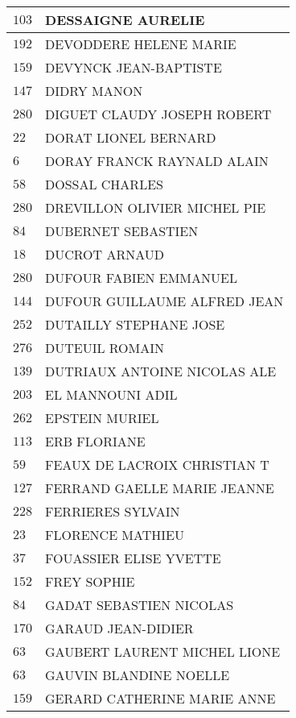 \begin{xltabular}{\linewidth}{|l|X|}
    $103$ & DESSAIGNE AURELIE \\
    \hline
    $192$ & DEVODDERE HELENE MARIE \\
    \hline
    $159$ & DEVYNCK JEAN-BAPTISTE \\
    \hline
    $147$ & DIDRY MANON \\
    \hline
    $280$ & DIGUET CLAUDY JOSEPH ROBERT \\
    \hline
    $22$ & DORAT LIONEL BERNARD \\
    \hline
    $6$ & DORAY FRANCK RAYNALD ALAIN \\
    \hline
    $58$ & DOSSAL CHARLES \\
    \hline
    $280$ & DREVILLON OLIVIER MICHEL PIE \\
    \hline
    $84$ & DUBERNET SEBASTIEN \\
    \hline
    $18$ & DUCROT ARNAUD \\
    \hline
    $280$ & DUFOUR FABIEN EMMANUEL \\
    \hline
    $144$ & DUFOUR GUILLAUME ALFRED JEAN \\
    \hline
    $252$ & DUTAILLY STEPHANE JOSE \\
    \hline
    $276$ & DUTEUIL ROMAIN \\
    \hline
    $139$ & DUTRIAUX ANTOINE NICOLAS ALE \\
    \hline
    $203$ & EL MANNOUNI ADIL \\
    \hline
    $262$ & EPSTEIN MURIEL \\
    \hline
    $113$ & ERB FLORIANE \\
    \hline
    $59$ & FEAUX DE LACROIX CHRISTIAN T \\
    \hline
    $127$ & FERRAND GAELLE MARIE JEANNE \\
    \hline
    $228$ & FERRIERES SYLVAIN \\
    \hline
    $23$ & FLORENCE MATHIEU \\
    \hline
    $37$ & FOUASSIER ELISE YVETTE \\
    \hline
    $152$ & FREY SOPHIE \\
    \hline
    $84$ & GADAT SEBASTIEN NICOLAS \\
    \hline
    $170$ & GARAUD JEAN-DIDIER \\
    \hline
    $63$ & GAUBERT LAURENT MICHEL LIONE \\
    \hline
    $63$ & GAUVIN BLANDINE NOELLE \\
    \hline
    $159$ & GERARD CATHERINE MARIE ANNE \\
    \hline

\end{xltabular}
